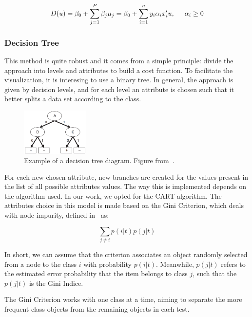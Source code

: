 \begin{equation}
    D(u)=\beta_0 + \sum_{j=1}^P \beta_j\mu_j = \beta_0+\sum_{i = 1}^ny_i\alpha_ix_i'u, \hspace{0.5cm} \alpha_i \geq 0 \label{eq19}
\end{equation}


\subsubsection{Decision Tree}
\label{Decision Tree}
This method is quite robust and it comes from a simple principle: divide the approach
into levels and attributes to build a cost function. To facilitate the visualization,
it is interesing to use a binary tree. In general, the approach is given by decision levels,
and for each level an attribute is chosen such that it better splits a data set 
according to the class.

\begin{figure}[htbp!]
    \centerline{\includegraphics[width=0.3\textwidth]{fig1.png}}
    \caption{Example of a decision tree diagram. Figure from~\cite{Kumar2005}.}
    \label{fig:Tree}
  \end{figure}

For each new chosen attribute, new branches are created for the values present in the list
of all possible attributes values. The way this is implemented depends on the algorithm
used. In our work, we opted for the CART algorithm. The attributes choice in this model
is made based on the Gini Criterion, which deals with node impurity, defined in~\cite{breiman1984} as:

\begin{equation}
    \sum_{j \neq i} p(i|t)p(j|t) \label{eq20}
\end{equation}

In short, we can assume that the criterion associates an object randomly selected from a 
node to the class $i$ with probability $p(i|t)$. Meanwhile, $p(j|t)$ refers to the 
estimated error probability that the item belongs to class $j$, such that the $p(j|t)$
is the Gini Indice.

The Gini Criterion works with one class at a time, aiming to separate the more frequent 
class objects from the remaining objects in each test. 

